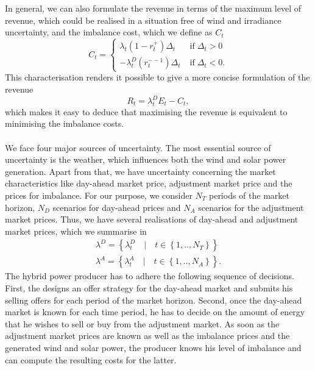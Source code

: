In general, we can also formulate the revenue in terms of the maximum level of revenue, which could be realised in a situation free of wind and irradiance uncertainty, and the imbalance cost, which we define as $C_{t}$
\begin{equation*}
	C_{t}=\begin{cases}
		\lambda_{t}\left(1-r_{t}^{+}\right)\Delta_{t} &\mathrm{\; if \;} \Delta_{t}>0
		\\ -\lambda_{t}^{D}\left(r_{t}^{--1}\right)\Delta_{t} &\mathrm{\; if \;} \Delta_{t}<0.
	\end{cases}
\end{equation*}
This characterisation renders it possible to give a more concise formulation of the revenue 
\begin{equation*}
	R_{t}=\lambda_{t}^{D}E_{t}-C_{t},
\end{equation*}
which makes it easy to deduce that maximising the revenue is equivalent to minimising the imbalance costs. 
\\ \\
We face four major sources of uncertainty. The most essential source of uncertainty is the weather, which influences both the wind and solar power generation. Apart from that, we have uncertainty concerning the market characteristics like day-ahead market price, adjustment market price and the prices for imbalance.
For our purpose, we consider $N_{T}$ periods of the market horizon, $N_{D}$ scenarios for day-ahead prices and $N_{A}$ scenarios for the adjustment market prices. Thus, we have several realisations of day-ahead and adjustment market prices, which we summarise in
\begin{align*}
	\lambda^{D}=\left\{\lambda_{t}^{D} \quad \lvert \quad t \in \left\{1, .., N_{T}\right\}\right\}
	\\ \lambda^{A}=\left\{\lambda_{t}^{A}\quad \lvert \quad t \in \left\{1, .., N_{A}\right\}\right\}.
\end{align*}
The hybrid power producer has to adhere the following sequence of decisions. First, the designs an offer strategy for the day-ahead market and submits his selling offers for each period of the market horizon. Second, once the day-ahead market is known for each time period, he has to decide on the amount of energy that he wishes to sell or buy from the adjustment market. As soon as the adjustment market prices are known as well as the imbalance prices and the generated wind and solar power, the producer knows his level of imbalance and can compute the resulting costs for the latter.  